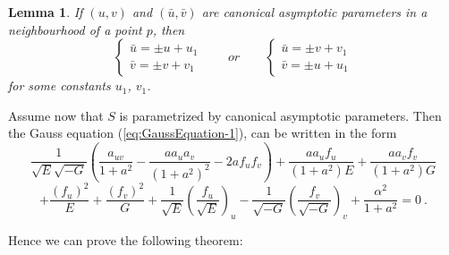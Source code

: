\documentclass[12pt]{amsart}
\newtheorem{lemma}[thm]{Lemma}
\theoremstyle{definition}
\theoremstyle{remark}
\begin{document}
\begin{lemma} If $(u,v)$ and $(\bar u,\bar v)$ are canonical asymptotic parameters
in a neighbourhood of a point $p$, then
$$
	\left\{\begin{array}{l}
	 \bar u=\pm u +u_1 \\
   \bar v=\pm v+v_1
	\end{array}\right.
\qquad
or
\qquad
	\left\{\begin{array}{l}
		\bar u=\pm v+v_1 \\
		\bar v=\pm u+u_1 
	\end{array}\right.	
$$
for some constants $u_1$, $v_1$.
\end{lemma}

Assume now that $S$ is
parametrized by canonical asymptotic parameters. Then  the Gauss equation
(\ref{eq:GaussEquation-1}), can be written in the form
$$
	 \frac1{\sqrt E\sqrt{-G}}\left(\frac{a_{uv}}{1+a^2}-\frac{aa_ua_v}{(1+a^2)^2} -2af_uf_v \right)
	   + \frac{  aa_uf_u}{(1+a^2)E}	   +\frac{  aa_vf_v}{(1+a^2)G}
$$
$$
	+ \frac{(f_u)^2}{ E}+\frac{(f_v)^2}{G} 
	+ \frac1{\sqrt E}\left(\frac{f_u}{\sqrt E}\right)_u -\frac1{\sqrt{-G}}\left(\frac{f_v}{\sqrt {-G}}\right)_v 
	 +\frac{\alpha^2}{1+a^2}=0  \ .
$$

Hence we can prove the following  theorem:
\end{document}
